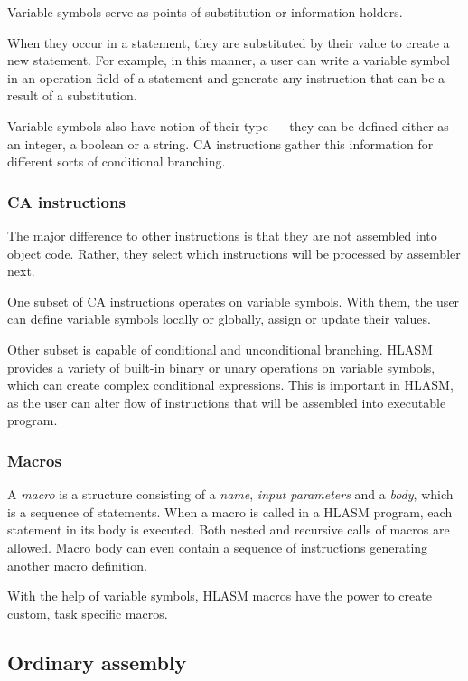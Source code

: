 Variable symbols serve as points of substitution or information holders. 

When they occur in a statement, they are substituted by their value to create a new statement. For example, in this manner, a user can write a variable symbol in an operation field of a statement and generate any instruction that can be a result of a substitution.

Variable symbols also have notion of their type --- they can be defined either as an integer, a boolean or a string. CA instructions gather this information for different sorts of conditional branching.

\subsubsection{CA instructions}

The major difference to other instructions is that they are not assembled into object code. Rather, they select which instructions will be processed by assembler next.

One subset of CA instructions operates on variable symbols. With them, the user can define variable symbols locally or globally, assign or update their values.

Other subset is capable of conditional and unconditional branching. HLASM provides a variety of built-in binary or unary operations on variable symbols, which can create complex conditional expressions. This is important in HLASM, as the user can alter flow of instructions that will be assembled into executable program.

\subsubsection{Macros}

A \emph{macro} is a structure consisting of a \emph{name}, \emph{input parameters} and a \emph{body}, which is a sequence of statements. When a macro is called in a HLASM program, each statement in its body is executed. Both nested and recursive calls of macros are allowed. Macro body can even contain a sequence of instructions generating another macro definition.

With the help of variable symbols, HLASM macros have the power to create custom, task specific macros.

\subsection{Ordinary assembly}

